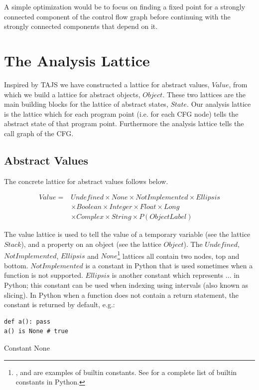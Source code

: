 A simple optimization would be to focus on finding a fixed point for a strongly connected component of the control flow graph before continuing with the strongly connected components that depend on it.

\section{The Analysis Lattice}
Inspired by TAJS \cite{tajs} we have constructed a lattice for abstract values, $Value$, from which we build a lattice for abstract objects, $Object$. These two lattices are the main building blocks for the lattice of abstract states, $State$. Our analysis lattice is the lattice which for each program point (i.e. for each CFG node) tells the abstract state of that program point. Furthermore the analysis lattice tells the call graph of the CFG.

\subsection{Abstract Values}
The concrete lattice for abstract values follows below.

\begin{eqnarray*}
Value = & Undefined \times None \times NotImplemented \times Ellipsis \\
        & \times Boolean \times Integer \times Float \times Long \\
        & \times Complex \times String \times P(ObjectLabel)
\end{eqnarray*}

The value lattice is used to tell the value of a temporary variable (see the lattice $Stack$), and a property on an object (see the lattice $Object$). The $Undefined$, $NotImplemented$, $Ellipsis$ and $None$\footnote{,  and  are examples of builtin constants. See \cite{pyref.constants} for a complete list of builtin constants in Python.} lattices all contain two nodes, top and bottom. $NotImplemented$ is a constant in Python that is used sometimes when a function is not supported. $Ellipsis$ is another constant which represents $\dots$ in Python; this constant can be used when indexing using intervals (also known as slicing). In Python when a function does not contain a return statement, the constant  is returned by default, e.g.:

\begin{listing}[H]
	\begin{verbatim}
def a(): pass
a() is None # true
	\end{verbatim}
	\caption{Constant None}\label{code:NoneExample}
\end{listing}

